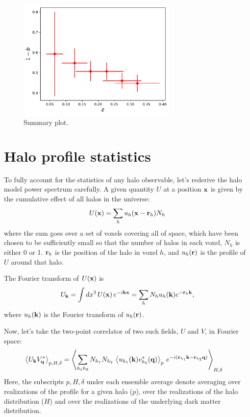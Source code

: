 \documentclass{article}
\begin{document}
  \begin{figure}
   \centering
   \includegraphics[width = 0.7\textwidth]{../output_test/sampler_minimal_hmc_b_hydro_all}
   \caption{Summary plot.}\label{fig:oneminusb}
  \end{figure}




\appendix
\section{Halo profile statistics}\label{app:hm}
  To fully account for the statistics of any halo observable, let's rederive the halo model power spectrum carefully. A given quantity $U$ at a position ${\bf x}$ is given by the cumulative effect of all halos in the universe:
  \begin{equation}
    U({\bf x})=\sum_h u_h({\bf x}-{\bf r}_h)N_h
  \end{equation}
  where the sum goes over a set of voxels covering all of space, which have been chosen to be sufficiently small so that the number of halos in each voxel, $N_h$ is either 0 or 1. ${\bf r}_h$ is the position of the halo in voxel $h$, and $u_h({\bf r})$ is the profile of $U$ around that halo.

  The Fourier transform of $U({\bf x})$ is
  \begin{align}\nonumber
    U_{\bf k}=\int dx^3\,U({\bf x})\,e^{-i{\bf k}{\bf x}}=\sum_h N_h u_h({\bf k}) e^{-{\bf r}_h{\bf k}},
  \end{align}
  where $u_h({\bf k})$ is the Fourier transform of $u_h({\bf r})$.

  Now, let's take the two-point correlator of two such fields, $U$ and $V$, in Fourier space:
  \begin{align}
    \left\langle U_{\bf k}V^*_{\bf q}\right\rangle_{p,H,\delta}&=\left\langle\sum_{h_1h_2}N_{h_1}N_{h_2}\,\left\langle u_{h_1}({\bf k})v^*_{h_2}({\bf q})\right\rangle_p\,e^{-i({\bf r}_{h_1}{\bf k}-{\bf r}_{h_2}{\bf q})}\right\rangle_{H,\delta}
  \end{align}
  Here, the subscripts $p,H,\delta$ under each ensemble average denote averaging over realizations of the profile for a given halo ($p$), over the realizations of the halo distribution ($H$) and over the realizations of the underlying dark matter distribution.
\end{document}
